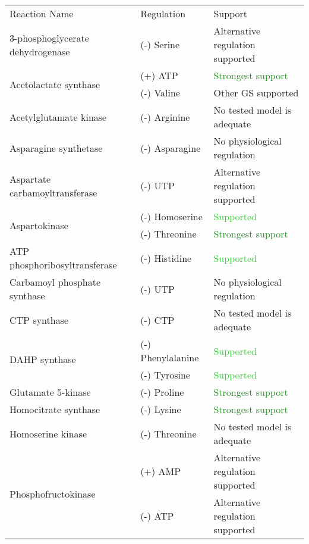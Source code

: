 \footnotesize
\begin{singlespace}
\begin{table}[H]
\centering
\begin{tabular}{|l|l|l|}
\hline
Reaction Name & Regulation & Support \\\Xhline{2\arrayrulewidth} 
3-phosphoglycerate dehydrogenase & (-) Serine & \textcolor{BurntOrange}{Alternative regulation supported}\\\hline
\multirow{2}{*}{Acetolactate synthase} & (+) ATP & \textcolor{ForestGreen}{Strongest support}\\ 
  & (-) Valine & Other GS supported\\\hline
 Acetylglutamate kinase & (-) Arginine & \textcolor{BurntOrange}{No tested model is adequate}\\\hline 
 Asparagine synthetase & (-) Asparagine & \textcolor{Cerulean}{No physiological regulation}\\\hline 
 Aspartate carbamoyltransferase & (-) UTP & \textcolor{BurntOrange}{Alternative regulation supported}\\\hline 
 \multirow{2}{*}{Aspartokinase} & (-) Homoserine & \textcolor{LimeGreen}{Supported}\\ 
  & (-) Threonine & \textcolor{ForestGreen}{Strongest support}\\\hline 
 ATP phosphoribosyltransferase & (-) Histidine & \textcolor{LimeGreen}{Supported}\\\hline 
 Carbamoyl phosphate synthase & (-) UTP & \textcolor{Cerulean}{No physiological regulation}\\\hline 
 CTP synthase & (-) CTP & \textcolor{BurntOrange}{No tested model is adequate}\\\hline 
 \multirow{2}{*}{DAHP synthase} & (-) Phenylalanine & \textcolor{LimeGreen}{Supported}\\ 
  & (-) Tyrosine & \textcolor{LimeGreen}{Supported}\\\hline 
 Glutamate 5-kinase & (-) Proline & \textcolor{ForestGreen}{Strongest support}\\\hline 
 Homocitrate synthase & (-) Lysine & \textcolor{ForestGreen}{Strongest support}\\\hline 
 Homoserine kinase & (-) Threonine & \textcolor{BurntOrange}{No tested model is adequate}\\\hline 
 \multirow{3}{*}{Phosphofructokinase} & (+) AMP & \textcolor{BurntOrange}{Alternative regulation supported}\\ 
  & (-) ATP & \textcolor{BurntOrange}{Alternative regulation supported}\\ 

\end{tabular}
\end{table}
\end{singlespace}
